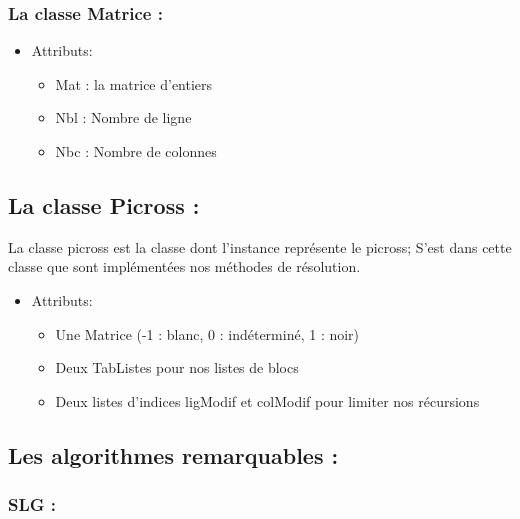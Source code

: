 \documentclass{article}
\begin{document}
\subsubsection{La classe Matrice :}
\begin{itemize}
\item Attributs:
\begin{itemize}
\item Mat : la matrice d'entiers
\item Nbl : Nombre de ligne
\item Nbc : Nombre de colonnes
\end{itemize}
\end{itemize}
\subsection{ La classe Picross :}
La classe picross est la classe dont l'instance représente le picross; S'est dans cette classe que sont implémentées nos méthodes de résolution.
\begin{itemize}
\item Attributs:
\begin{itemize}
\item Une Matrice (-1 : blanc, 0 : indéterminé, 1 : noir)
\item Deux TabListes pour nos listes de blocs
\item Deux listes d'indices ligModif et colModif pour limiter nos récursions
\end{itemize}
\end{itemize}
\subsection{Les algorithmes remarquables :}
\subsubsection{SLG :}
\end{document}
